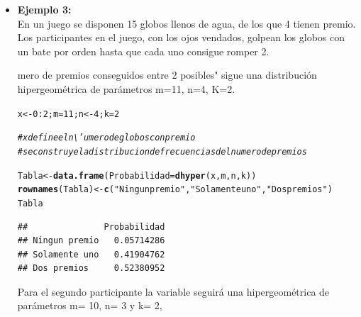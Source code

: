 \documentclass[12pt,letterpaper]{article}\usepackage[]{graphicx}\usepackage[]{color}
\makeatletter
\newcommand{\hlnum}[1]{\textcolor[rgb]{0.686,0.059,0.569}{#1}}%
\newcommand{\hlstr}[1]{\textcolor[rgb]{0.192,0.494,0.8}{#1}}%
\newcommand{\hlcom}[1]{\textcolor[rgb]{0.678,0.584,0.686}{\textit{#1}}}%
\newcommand{\hlopt}[1]{\textcolor[rgb]{0,0,0}{#1}}%
\newcommand{\hlstd}[1]{\textcolor[rgb]{0.345,0.345,0.345}{#1}}%
\newcommand{\hlkwb}[1]{\textcolor[rgb]{0.69,0.353,0.396}{#1}}%
\newcommand{\hlkwc}[1]{\textcolor[rgb]{0.333,0.667,0.333}{#1}}%
\newcommand{\hlkwd}[1]{\textcolor[rgb]{0.737,0.353,0.396}{\textbf{#1}}}%
\newenvironment{kframe}{%
 \def\at@end@of@kframe{}%
 \ifinner\ifhmode%
  \def\at@end@of@kframe{\end{minipage}}%
  \begin{minipage}{\columnwidth}%
 \fi\fi%
 \def\FrameCommand##1{\hskip\@totalleftmargin \hskip-\fboxsep
 \colorbox{shadecolor}{##1}\hskip-\fboxsep
     \hskip-\linewidth \hskip-\@totalleftmargin \hskip\columnwidth}%
 \MakeFramed {\advance\hsize-\width
   \@totalleftmargin\z@ \linewidth\hsize
   \@setminipage}}%
 {\par\unskip\endMakeFramed%
 \at@end@of@kframe}
\newenvironment{knitrout}{}{} %
\makeatother
\begin{document}
\begin{itemize}
\begin{knitrout}
\end{knitrout}
\item \textbf{Ejemplo 3:}\\

En un juego se disponen 15 globos llenos de agua, de los que 4 tienen premio. Los participantes en el juego, con los ojos vendados, golpean los globos con un bate por orden hasta que cada uno consigue romper 2. 


mero de premios conseguidos entre 2 posibles" sigue una distribuci\'on hipergeom\'etrica de par\'ametros m=11, n=4, K=2. 

\begin{knitrout}
\color{fgcolor}\begin{kframe}
\begin{alltt}
\hlstd{x} \hlkwb{<-} \hlnum{0}\hlopt{:}\hlnum{2}\hlstd{; m} \hlkwb{=} \hlnum{11}\hlstd{; n} \hlkwb{<-} \hlnum{4}\hlstd{; k}\hlkwb{=}\hlnum{2}

\hlcom{# x define el n\textbackslash{}'umero de globos con premio }
\hlcom{# se construye la distribucion de frecuencias del numero de premios }

\hlstd{Tabla} \hlkwb{<-} \hlkwd{data.frame}\hlstd{(}\hlkwc{Probabilidad}\hlstd{=}\hlkwd{dhyper}\hlstd{(x, m, n, k))}
\hlkwd{rownames}\hlstd{(Tabla)} \hlkwb{<-} \hlkwd{c}\hlstd{(}\hlstr{"Ningun premio"}\hlstd{,}\hlstr{"Solamente uno"}\hlstd{,} \hlstr{"Dos premios"}\hlstd{)}
\hlstd{Tabla}
\end{alltt}
\begin{verbatim}
##               Probabilidad
## Ningun premio   0.05714286
## Solamente uno   0.41904762
## Dos premios     0.52380952
\end{verbatim}
\end{kframe}
\end{knitrout}


Para el segundo participante la variable seguir\'a una hipergeom\'etrica de par\'ametros m= 10, n= 3 y k= 2, 


\end{itemize}
\end{document}
